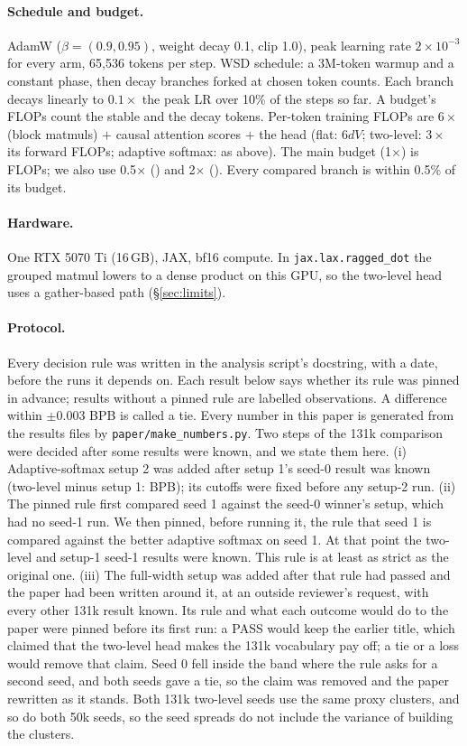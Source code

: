 \documentclass[11pt]{article}
\theoremstyle{remark}
\begin{document}
\paragraph{Schedule and budget.} AdamW ($\beta = (0.9, 0.95)$, weight decay 0.1, clip 1.0), peak learning rate $2\times10^{-3}$
for every arm, 65,536 tokens per step. WSD schedule: a 3M-token warmup and a constant phase, then decay branches forked at chosen
token counts. Each branch decays linearly to $0.1\times$ the peak LR over 10\% of the steps so far. A budget's FLOPs count the
stable and the decay tokens. Per-token training FLOPs are $6\times$(block matmuls) $+$ causal attention scores $+$ the head
(flat: $6dV$; two-level: $3\times$ its forward FLOPs; adaptive softmax: as above). The main budget (1$\times$) is \TargetFlops{}
FLOPs; we also use 0.5$\times$ (\GapFlopsHalf{}) and 2$\times$ (\GapFlopsTwo{}). Every compared branch is within 0.5\% of its
budget.

\paragraph{Hardware.} One RTX 5070 Ti (16\,GB), JAX, bf16 compute. In \texttt{jax.lax.ragged\_dot} the grouped matmul lowers to a
dense product on this GPU, so the two-level head uses a gather-based path (\S\ref{sec:limits}).

\paragraph{Protocol.}\label{sec:protocol} Every decision rule was written in the analysis script's docstring, with a date, before
the runs it depends on. Each result below says whether its rule was pinned in advance; results without a pinned rule are labelled
observations. A difference within $\pm 0.003$ BPB is called a tie. Every number in this paper is generated from the results files
by \texttt{paper/make\_numbers.py}. Two steps of the 131k comparison were decided after some results were known, and we state
them here. (i) Adaptive-softmax setup 2 was added after setup 1's seed-0 result was known (two-level minus setup 1:
\BigDOldZero{} BPB); its cutoffs were fixed before any setup-2 run. (ii) The pinned rule first compared seed 1 against the
seed-0 winner's setup, which had no seed-1 run. We then pinned, before running it, the rule that seed 1 is compared against the
better adaptive softmax on seed 1. At that point the two-level and setup-1 seed-1 results were known. This rule is at least as
strict as the original one. (iii) The full-width setup was added after that rule had passed and the paper had been written
around it, at an outside reviewer's request, with every other 131k result known. Its rule and what each outcome would do to the
paper were pinned before its first run: a PASS would keep the earlier title, which claimed that the two-level head makes the
131k vocabulary pay off; a tie or a loss would remove that claim. Seed 0 fell inside the band where the rule asks for a second
seed, and both seeds gave a tie, so the claim was removed and the paper rewritten as it stands. Both 131k two-level seeds use the same proxy clusters, and so do both 50k seeds, so the seed spreads
do not include the variance of building the clusters.
\end{document}
